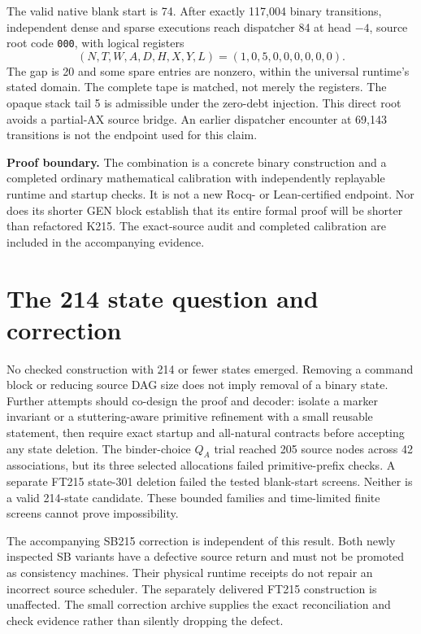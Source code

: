 \documentclass[11pt]{article}
\begin{document}
The valid native blank start is 74. After exactly 117,004 binary transitions, independent dense and sparse executions reach dispatcher 84 at head $-4$, source root code \texttt{000}, with logical registers
\[
 (N,T,W,A,D,H,X,Y,L)=(1,0,5,0,0,0,0,0,0).
\]
The gap is 20 and some spare entries are nonzero, within the universal runtime's stated domain. The complete tape is matched, not merely the registers. The opaque stack tail 5 is admissible under the zero-debt injection. This direct root avoids a partial-AX source bridge. An earlier dispatcher encounter at 69,143 transitions is not the endpoint used for this claim.

\textbf{Proof boundary.} The combination is a concrete binary construction and a completed ordinary mathematical calibration with independently replayable runtime and startup checks. It is not a new Rocq- or Lean-certified endpoint. Nor does its shorter GEN block establish that its entire formal proof will be shorter than refactored K215. The exact-source audit and completed calibration are included in the accompanying evidence.

\section{The 214 state question and correction}
No checked construction with 214 or fewer states emerged. Removing a command block or reducing source DAG size does not imply removal of a binary state. Further attempts should co-design the proof and decoder: isolate a marker invariant or a stuttering-aware primitive refinement with a small reusable statement, then require exact startup and all-natural contracts before accepting any state deletion. The binder-choice $Q_A$ trial reached 205 source nodes across 42 associations, but its three selected allocations failed primitive-prefix checks. A separate FT215 state-301 deletion failed the tested blank-start screens. Neither is a valid 214-state candidate. These bounded families and time-limited finite screens cannot prove impossibility.

The accompanying SB215 correction is independent of this result. Both newly inspected SB variants have a defective source return and must not be promoted as consistency machines. Their physical runtime receipts do not repair an incorrect source scheduler. The separately delivered FT215 construction is unaffected. The small correction archive supplies the exact reconciliation and check evidence rather than silently dropping the defect.
\end{document}
